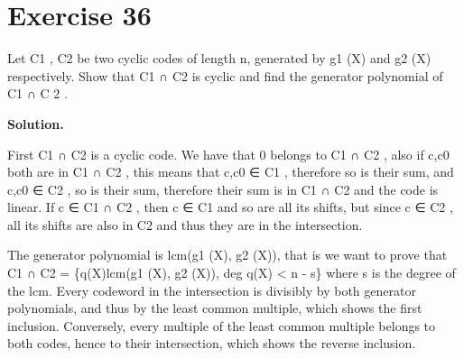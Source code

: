 \documentclass[11pt]{article}
\begin{document}
\section*{Exercise 36}
\begin{exercisebox}
Let C1 , C2 be two cyclic codes of length n, generated by g1 (X) and g2 (X) respectively. Show that C1 ∩ C2 is cyclic and find the generator polynomial of C1 ∩ C 2 .

\end{exercisebox}
\begin{solutionbox}
\textbf{Solution.}

First C1 ∩ C2 is a cyclic code. We have that 0 belongs to C1 ∩ C2 , also if c,c0 both are in C1 ∩ C2 , this means that c,c0 ∈ C1 , therefore so is their sum, and c,c0 ∈ C2 , so is their sum, therefore their sum is in C1 ∩ C2 and the code is linear. If c ∈ C1 ∩ C2 , then c ∈ C1 and so are all its shifts, but since c ∈ C2 , all its shifts are also in C2 and thus they are in the intersection.

The generator polynomial is lcm(g1 (X), g2 (X)), that is we want to prove that C1 ∩ C2 = \{q(X)lcm(g1 (X), g2 (X)), deg q(X) < n - s\} where s is the degree of the lcm. Every codeword in the intersection is divisibly by both generator polynomials, and thus by the least common multiple, which shows the first inclusion. Conversely, every multiple of the least common multiple belongs to both codes, hence to their intersection, which shows the reverse inclusion.

\end{solutionbox}
\end{document}
